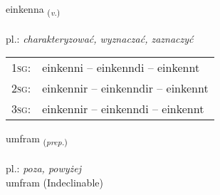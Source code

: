 \documentclass[frontgrid, backgrid]{flacards}\usepackage[]{graphicx}\usepackage[]{xcolor}
\begin{document}
\renewcommand{\flhead}{\vskip5pt \fboxsep=0pt {\small\bfseries\footnotesize Sagnorð | Verb}}
\renewcommand{\fcfoot}{\vskip5pt \fboxsep=0pt \hspace{2pt}{\small\bfseries\footnotesize 2K}}

\renewcommand{\blhead}{\vskip5pt {\small\bfseries\footnotesize Sagnorð | Verb }}
\renewcommand{\bcfoot}{\vskip5pt \hspace{2pt}{\small\bfseries\footnotesize 2K}}


{einkenna \small{\textsubscript{(\textit{v.})}} \\[1ex] %
\textphonetic{[eiɲcʰɛna]} \\
pl.: \emph{charakteryzować, wyznaczać, zaznaczyć} \\  [2ex]
\renewcommand*{\arraystretch}{0.8}
\begin{tabular}{p{1cm}l}
\textsc{1sg}: & einkenni -- einkenndi -- einkennt \\ 
\textsc{2sg}: & einkennir -- einkenndir -- einkennt \\ 
\textsc{3sg}: & einkennir -- einkenndi -- einkennt \\ 
\end{tabular}
}


\renewcommand{\flhead}{\vskip5pt \fboxsep=0pt {\small\bfseries\footnotesize Forsetning | Preposition}}
\renewcommand{\fcfoot}{\vskip5pt \fboxsep=0pt \hspace{2pt}{\small\bfseries\footnotesize 2K}}

\renewcommand{\blhead}{\vskip5pt {\small\bfseries\footnotesize Forsetning | Preposition }}
\renewcommand{\bcfoot}{\vskip5pt \hspace{2pt}{\small\bfseries\footnotesize 2K}}


{umfram \small{\textsubscript{(\textit{prep.})}} \\[1ex]
\textphonetic{[ʏmfram]} \\
pl.: \emph{poza, powyżej} \\  [2ex]
umfram (Indeclinable)}
\end{document}
